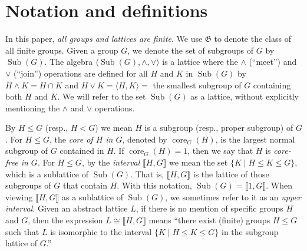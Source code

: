 \documentclass{gen-j-l}
\newcommand{\lb}{\ensuremath{\llbracket}}
\newcommand{\rb}{\ensuremath{\rrbracket}}
\newcommand{\<}{\ensuremath{\langle}}
\renewcommand{\>}{\ensuremath{\rangle}}
\theoremstyle{plain}
\theoremstyle{definition}
\theoremstyle{remark}
\numberwithin{theorem}{section}
\numberwithin{claim}{section}
\numberwithin{equation}{section}
\numberwithin{conjecture}{section}
\newcommand{\defn}[1]{\emph{#1}}
\renewcommand{\leq}{\ensuremath{\leqslant}}
\newcommand{\meet}{\ensuremath{\wedge}}
\newcommand{\join}{\ensuremath{\vee}}
\newcommand{\Sub}{\ensuremath{\operatorname{Sub}}}
\newcommand{\core}{\ensuremath{\operatorname{core}}}
\newcommand{\2}{\ensuremath{\mathbf{2}}}
\newcommand{\3}{\ensuremath{\mathbf{3}}}
\newcommand{\G}{\ensuremath{\mathfrak{G}}}
\begin{document}

\section{Notation and definitions}
\label{sec:notation-definitions}
In this paper, \emph{all groups and lattices are finite}.  We use 
$\G$ to denote the class of all finite groups.
Given a group $G$, we denote the set of subgroups of $G$ by $\Sub(G)$.  The
algebra $\<\Sub(G), \meet, \join\>$ is a lattice where the $\meet$ (``meet'') and
$\join$ (``join'') operations are defined for all $H$ and $K$ in $\Sub(G)$ by
$H\meet K = H\cap K$ and $H\join K = \<H, K\> = $ the smallest subgroup of $G$
containing both $H$ and $K$.  We will refer to the set
$\Sub(G)$ as a lattice, without explicitly mentioning the $\meet$ and
$\join$ operations.

By $H \leq G$ (resp.,
$H < G$) we mean $H$ is a subgroup (resp., proper subgroup) of $G$.
For $H\leq G$, the
\emph{core of $H$ in $G$}, denoted by $\core_G(H)$, is the largest normal subgroup of $G$
contained in $H$.
If $\core_G(H)=1$, then we say that $H$ is \emph{core-free in $G$}.
For $H\leq G$,
by the \defn{interval} $\lb H, G \rb$ we mean 
the set $\{K \mid H\leq K \leq G\}$, which is a
sublattice of $\Sub(G)$.
That is, $\lb H,G \rb$ is the lattice of those subgroups of $G$ that contain 
$H$. 
With this notation, $\Sub(G)=\lb 1,G \rb$.
When viewing $\lb H,G \rb$ as a
sublattice of $\Sub(G)$, we sometimes refer to it as an \defn{upper interval}. 
Given an abstract lattice $L$, if there is no mention of specific groups $H$ and
$G$, then the expression $L \cong \lb H, G \rb$ means ``there exist (finite) groups $H
\leq G$ such that $L$ is isomorphic to the interval $\{K \mid H\leq K \leq G\}$ in
the subgroup lattice of $G$.''  
\end{document}
